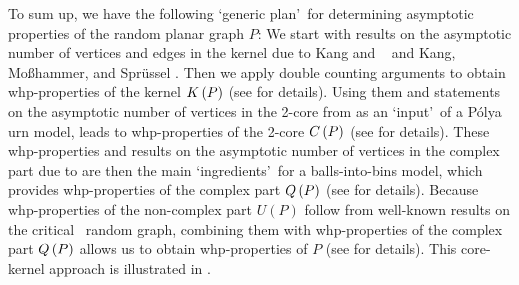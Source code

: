 To sum up, we have the following \lq generic plan\rq\ for determining asymptotic properties of the random planar graph $P$: We start with results on the asymptotic number of vertices and edges in the kernel due to Kang and \Luczak\ \cite{KangLuczak2012} and Kang, Mo{\ss}hammer, and Spr\"{u}ssel \cite{KangMosshammerSpruessel2020}. Then we apply double counting arguments to obtain whp-properties of the kernel $K\left(P\right)$ (see  for details). Using them and statements on the asymptotic number of vertices in the 2-core from \cite{KangLuczak2012,KangMosshammerSpruessel2020} as an \lq input\rq\ of a P\'olya urn model, leads to whp-properties of the 2-core $C\left(P\right)$ (see  for details). These whp-properties and results on the asymptotic number of vertices in the complex part due to \cite{KangLuczak2012,KangMosshammerSpruessel2020} are then the main \lq ingredients\rq\ for a balls-into-bins model, which provides whp-properties of the complex part $Q\left(P\right)$ (see  for details). Because whp-properties of the non-complex part $U(P)$ follow from well-known results on the critical \ER\ random graph, combining them with whp-properties of the complex part $Q\left(P\right)$ allows us to obtain whp-properties of $P$ (see  for details). This core-kernel approach is illustrated in .

